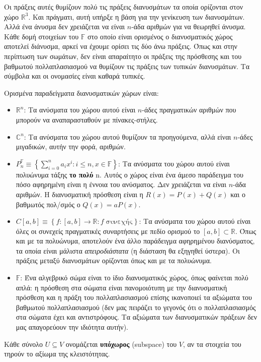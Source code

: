 \documentclass[main.tex]{subfiles}
\begin{document}
	Οι πράξεις αυτές θυμίζουν πολύ τις πράξεις διανυσμάτων τα οποία ορίζονται στον χώρο $\mathbb{R}^3$. Και πράγματι, αυτή υπήρξε η βάση για την γενίκευση των διανυσμάτων. Αλλά ένα άνυσμα δεν χρειάζεται να είναι $n$-άδα αριθμών για να θεωρηθεί άνυσμα. Κάθε δομή στοιχείων του $\mathbb{F}$ στο οποίο είναι ορισμένος ο διανυσματικός χώρος αποτελεί διάνυσμα, αρκεί να έχουμε ορίσει τις δύο άνω πράξεις. Όπως και στην περίπτωση των σωμάτων, δεν είναι απαραίτητο οι πράξεις της πρόσθεσης και του βαθμωτού πολλαπλασιασμού να θυμίζουν τις πράξεις των τυπικών διανυσμάτων. Τα σύμβολα και οι ονομασίες είναι καθαρά τυπικές. 
	
	Ορισμένα παραδείγματα διανυσματικών χώρων είναι:
	\begin{itemize}
		\item $\mathbb{R}^n$: Τα ανύσματα του χώρου αυτού είναι $n$-άδες πραγματικών αριθμών που μπορούν να αναπαρασταθούν με πίνακες-στήλες.
		\item $\mathbb{C}^n$: Τα ανύσματα του χώρου αυτού θυμίζουν τα προηγούμενα, αλλά είναι  $n$-άδες μιγαδικών, αυτήν την φορά, αριθμών. 
		\item ${P^\mathbb{F}_n \equiv \left\{\sum_{i=0}^na_ix^i : i\leq n, x\in\mathbb{F}\right\}}$: Τα ανύσματα του χώρου αυτού είναι πολυώνυμα τάξης \textbf{το πολύ} n. Αυτός ο χώρος είναι ένα άμεσο παράδειγμα του πόσο αφηρημένη είναι η έννοια του ανύσματος. Δεν χρειάζεται να είναι $n$-άδα αριθμών. H διανυσματική πρόσθεση είναι η ${R(x) = P(x) + Q(x)}$ και ο βαθμωτός πολ/σμός ο $Q(x) = aP(x)$.
		\item ${C[a, b] \equiv \left\{f:[a,b]\rightarrow\mathbb{R}:f \;\text{συνεχής}\right\}}$: Τα ανύσματα του χώρου αυτού είναι όλες οι συνεχείς πραγματικές συναρτήσεις με πεδίο ορισμού το $[a, b] \subset \mathbb{R}$. Όπως και με τα πολυώνυμα, αποτελούν ένα άλλο παράδειγμα αφηρημένου διανύσματος, τα οποία είναι μάλιστα \textit{απειροδιάστατα} (η διάσταση θα εξηγηθεί ύστερα). Οι πράξεις μεταξύ διανυσμάτων ορίζονται όπως και με τα πολυώνυμα.
		\item $\mathbb{F}$: Ένα αλγεβρικό σώμα είναι το ίδιο διανυσματικός χώρος, όπως φαίνεται πολύ απλά: η πρόσθεση στα σώματα είναι πανομοιότυπη με την διανυσματική πρόσθεση και η πράξη του πολλαπλασιασμού επίσης ικανοποιεί τα αξιώματα του βαθμωτού πολλαπλασιασμού (δεν μας πειράζει το γεγονός ότι ο πολλαπλασιασμός στα σώματα έχει και αντιστρόφους. Τα αξιώματα των διανυσματικών πράξεων δεν μας απαγορεύουν την ιδιότητα αυτήν).
	\end{itemize}

	\begin{definition}
	Κάθε σύνολο ${U \subseteq V}$ ονομάζεται \textbf{υπόχωρος} (subspace) του $V$, αν τα στοιχεία του τηρούν το αξίωμα της κλειστότητας.
	\end{definition}
\end{document}
